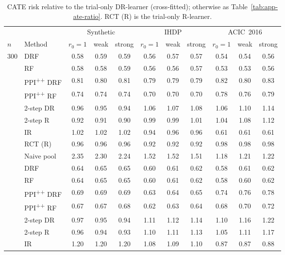 \begin{table}[h]
\caption{CATE risk relative to the trial-only DR-learner (cross-fitted); otherwise as Table~\ref{tab:app-ate-ratio}. RCT (R) is the trial-only R-learner.}
\label{tab:app-cate-ratio}
\begin{center}\footnotesize
\begin{tabular}{@{}llccccccccc@{}}
\toprule
& & \multicolumn{3}{c}{Synthetic} & \multicolumn{3}{c}{IHDP} & \multicolumn{3}{c}{ACIC~2016}\\
\cmidrule(lr){3-5}\cmidrule(lr){6-8}\cmidrule(lr){9-11}
$n$ & Method & $r_0{=}1$ & weak & strong & $r_0{=}1$ & weak & strong & $r_0{=}1$ & weak & strong\\
\midrule
300 & DRF & 0.58 & 0.59 & 0.59 & 0.56 & 0.57 & 0.57 & 0.54 & 0.54 & 0.56 \\
 & RF & 0.58 & 0.58 & 0.59 & 0.56 & 0.56 & 0.57 & 0.53 & 0.53 & 0.56 \\
 & PPI\textsuperscript{++} DRF & 0.81 & 0.80 & 0.81 & 0.79 & 0.79 & 0.79 & 0.82 & 0.80 & 0.83 \\
 & PPI\textsuperscript{++} RF & 0.74 & 0.74 & 0.74 & 0.70 & 0.70 & 0.70 & 0.78 & 0.76 & 0.79 \\
 & 2-step DR & 0.96 & 0.95 & 0.94 & 1.06 & 1.07 & 1.08 & 1.06 & 1.10 & 1.14 \\
 & 2-step R & 0.92 & 0.91 & 0.90 & 0.99 & 0.99 & 1.01 & 1.04 & 1.08 & 1.12 \\
 & IR & 1.02 & 1.02 & 1.02 & 0.94 & 0.96 & 0.96 & 0.61 & 0.61 & 0.61 \\
 & RCT (R) & 0.96 & 0.96 & 0.96 & 0.92 & 0.92 & 0.92 & 0.98 & 0.98 & 0.98 \\
 & Naive pool & 2.35 & 2.30 & 2.24 & 1.52 & 1.52 & 1.51 & 1.18 & 1.21 & 1.22 \\
\addlinespace
900 & DRF & 0.64 & 0.65 & 0.65 & 0.60 & 0.61 & 0.62 & 0.58 & 0.61 & 0.62 \\
 & RF & 0.64 & 0.65 & 0.65 & 0.60 & 0.61 & 0.62 & 0.58 & 0.60 & 0.62 \\
 & PPI\textsuperscript{++} DRF & 0.69 & 0.69 & 0.69 & 0.63 & 0.64 & 0.65 & 0.74 & 0.76 & 0.78 \\
 & PPI\textsuperscript{++} RF & 0.67 & 0.67 & 0.68 & 0.62 & 0.63 & 0.64 & 0.68 & 0.70 & 0.72 \\
 & 2-step DR & 0.97 & 0.95 & 0.94 & 1.11 & 1.12 & 1.14 & 1.10 & 1.16 & 1.22 \\
 & 2-step R & 0.96 & 0.94 & 0.93 & 1.10 & 1.11 & 1.13 & 1.05 & 1.11 & 1.17 \\
 & IR & 1.20 & 1.20 & 1.20 & 1.08 & 1.09 & 1.10 & 0.87 & 0.87 & 0.88 \\

\end{tabular}
\end{center}
\end{table}
